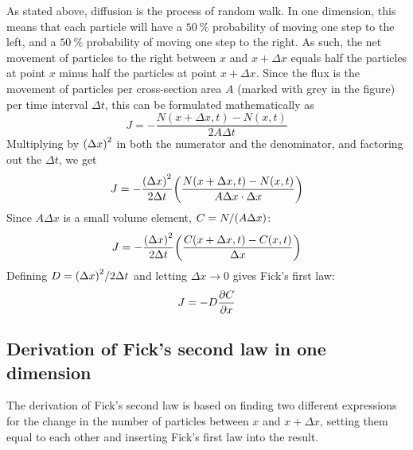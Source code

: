 \documentclass[12pt,english,a4paper]{article}
\begin{document}
As stated above, diffusion is the process of random walk. In one dimension, this means that each particle will have a \(\SI{50}{\percent}\) probability of moving one step to the left, and a \(\SI{50}{\percent}\) probability of moving one step to the right. As such, the net movement of particles to the right between \(x\) and \(x+\Delta x\) equals half the particles at point \(x\) minus half the particles at point \(x+\Delta x\). Since the flux is the movement of particles per cross-section area \(A\) (marked with grey in the figure) per time interval \(\Delta t\), this can be formulated mathematically as
\[
    J = -\frac{N(x+\Delta x, t) - N(x,t)}{2A\Delta t}
\]
Multiplying by \(\qty(\Delta x)^2\) in both the numerator and the denominator, and factoring out the \(\Delta t\), we get
\[
    J = -\frac{\qty(\Delta x)^2}{2\Delta t}\qty(\frac{N(x+\Delta x,t) - N(x,t)}{A\Delta x\cdot\Delta x})
\]
Since \(A\Delta x\) is a small volume element, \(C=N/\qty(A\Delta x)\):
\[
    J = -\frac{\qty(\Delta x)^2}{2\Delta t} \qty(\frac{C(x+\Delta x,t) - C(x,t)}{\Delta x})
\]
Defining \(D=\qty(\Delta x)^2/2\Delta t\) and letting \(\Delta x\to0\) gives Fick's first law:
\[
    J = -D\pdv{C}{x}
\]

\subsection{Derivation of Fick's second law in one dimension}
The derivation of Fick's second law is based on finding two different expressions for the change in the number of particles between \(x\) and \(x+\Delta x\), setting them equal to each other and inserting Fick's first law into the result.
\end{document}
